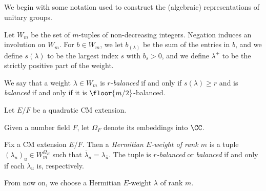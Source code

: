 \documentclass{article}
\begin{document}
\subsection{}
We begin with some notation used to construct the (algebraic) representations of unitary groups.
\begin{notation}
	Let $W_m$ be the set of $m$-tuples of non-decreasing integers. Negation induces an involution on $W_m$. For $b\in W_m$, we let $b_{(\lambda)}$ be the sum of the entries in $b$, and we define $s(\lambda)$ to be the largest index $s$ with $b_s>0$, and we define $\lambda^+$ to be the strictly positive part of the weight.
\end{notation}
\begin{definition}
	We say that a weight $\lambda\in W_m$ is \textit{$r$-balanced} if and only if $s(\lambda)\ge r$ and is \textit{balanced} if and only if it is $\floor{m/2}$-balanced.
\end{definition}
Let $E/F$ be a quadratic CM extension.
\begin{notation}
	Given a number field $F$, let $\Omega_F$ denote its embeddings into $\CC$.
\end{notation}
\begin{definition}
	Fix a CM extension $E/F$. Then a \textit{Hermitian $E$-weight of rank $m$} is a tuple $(\lambda_u)_u\in W_m^{\Omega_E}$ such that $\overline\lambda_u=\lambda_{\overline u}$. The tuple is \textit{$r$-balanced} or \textit{balanced} if and only if each $\lambda_u$ is, respectively.
\end{definition}
From now on, we choose a Hermitian $E$-weight $\lambda$ of rank $m$.
\end{document}
